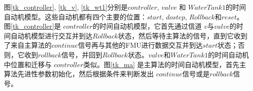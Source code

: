\begin{figure}[htbp]
\end{figure}

图\ref{tk_controller}, \ref{tk_v}, \ref{tk_wt1}分别是$controller$, $valve$ 和 $WaterTank1$的时间自动机模型。这些自动机都有四个主要的位置：$start$, $dostep$, $Rollback$和$reset$。图\ref{tk_controller}是 $controller$的时间自动机模型，它首先通过信道 $v$与$valve$的时间自动机模型进行交互并到达$Rollback$状态，然后等待主算法的信号，直到它收到了来自主算法的$continue$信号再与其他的FMU进行数据交互并到达$start$状态；否则，它收到$rollback$信号，并回到$Rollback$状态。$valve$和$WaterTank1$的时间自动机中位置和迁移与 $controller$类似。图\ref{tk_ma} 是主算法的时间自动机模型，首先主算法先进性参数初始化，然后根据条件来判断发出  $continue$信号或是$rollback$信号。

